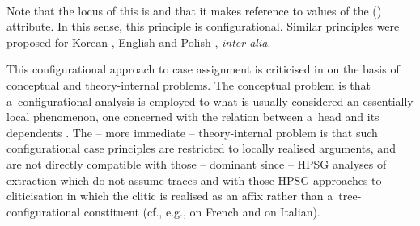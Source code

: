 \documentclass[output=paper]{langsci/langscibook}
\begin{document}
  \hspace*{\fill}
\z
\ea
{} \impl\\
  \hspace*{\fill}
\z
Note that the locus of this  is  and that it makes reference to  values of the  () attribute.  In this sense, this principle is configurational.  Similar principles were proposed for Korean \citep{Yoo93a-u,brat:96}, English \citep{Grover95a-u} and Polish \citep{prze:95b}, \emph{inter alia}.

This configurational approach to case assignment is criticised in \citealt{prze:96,Prze99,Prze99b} on the basis of conceptual and theory-internal problems.  The conceptual problem is that a~configurational analysis is employed to what is usually considered an essentially local phenomenon, one concerned with the relation between a~head and its dependents \citep{blak:94}.  The – more immediate – theory-internal problem is that such configurational case principles are restricted to locally realised arguments, and are not directly compatible with those – dominant since \citealt[Chapter~9]{ps2} – HPSG analyses of extraction which do not assume traces and with those HPSG approaches to cliticisation in which the clitic is realised as an affix rather than a~tree-configurational constituent (cf., e.g., \citealt{MS97a-u} on French and \citealt{Monachesi99a-u} on Italian).
\end{document}
